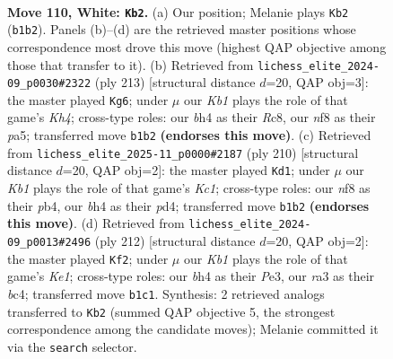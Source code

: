 \documentclass[11pt]{article}
\begin{document}
\clearpage

\begin{figure}[p]\centering
\begin{subfigure}{0.46\textwidth}\centering
\resizebox{\linewidth}{!}{%
\newchessgame
\chessboard[
  setfen={5n2/1R6/7p/4p3/6kb/r2p4/8/1K6 w - - 16 110},
  showmover=false,
  pgfstyle=straightmove, color=movearrow, markmove={b1-b2}
]}
\caption{}
\end{subfigure}\hfill
\begin{subfigure}{0.46\textwidth}\centering
\resizebox{\linewidth}{!}{%
\newchessgame
\chessboard[
  setfen={2r5/8/8/P3K2k/3R4/8/3Bb3/8 b - - 64 107},
  showmover=false,
  pgfstyle=straightmove, color=movearrow, markmove={h5-g6}
]}
\caption{}
\end{subfigure}
\\[4pt]
\begin{subfigure}{0.46\textwidth}\centering
\resizebox{\linewidth}{!}{%
\newchessgame
\chessboard[
  setfen={8/2R5/8/8/1p1p4/1k6/4r3/2K5 w - - 4 106},
  showmover=false,
  pgfstyle=straightmove, color=movearrow, markmove={c1-d1}
]}
\caption{}
\end{subfigure}\hfill
\begin{subfigure}{0.46\textwidth}\centering
\resizebox{\linewidth}{!}{%
\newchessgame
\chessboard[
  setfen={r7/8/8/2k5/2b1pN2/4P3/8/1R2K3 w - - 76 107},
  showmover=false,
  pgfstyle=straightmove, color=movearrow, markmove={e1-f2}
]}
\caption{}
\end{subfigure}
\caption{\textbf{Move 110, White: \texttt{Kb2}.} (a) Our position; Melanie plays \texttt{Kb2} (\texttt{b1b2}). Panels (b)--(d) are the retrieved master positions whose correspondence most drove this move (highest QAP objective among those that transfer to it). (b) Retrieved from \texttt{lichess\_elite\_2024-09\_p0030\#2322} (ply 213) [structural distance $d$=20, QAP obj=3]: the master played \texttt{Kg6}; under $\mu$ our \emph{Kb1} plays the role of that game's \emph{Kh4}; cross-type roles: our \emph{b}h4 as their \emph{R}c8, our \emph{n}f8 as their \emph{p}a5; transferred move \texttt{b1b2} \textbf{(endorses this move)}. (c) Retrieved from \texttt{lichess\_elite\_2025-11\_p0000\#2187} (ply 210) [structural distance $d$=20, QAP obj=2]: the master played \texttt{Kd1}; under $\mu$ our \emph{Kb1} plays the role of that game's \emph{Kc1}; cross-type roles: our \emph{n}f8 as their \emph{p}b4, our \emph{b}h4 as their \emph{p}d4; transferred move \texttt{b1b2} \textbf{(endorses this move)}. (d) Retrieved from \texttt{lichess\_elite\_2024-09\_p0013\#2496} (ply 212) [structural distance $d$=20, QAP obj=2]: the master played \texttt{Kf2}; under $\mu$ our \emph{Kb1} plays the role of that game's \emph{Ke1}; cross-type roles: our \emph{b}h4 as their \emph{P}e3, our \emph{r}a3 as their \emph{b}c4; transferred move \texttt{b1c1}. Synthesis: 2 retrieved analogs transferred to \texttt{Kb2} (summed QAP objective 5, the strongest correspondence among the candidate moves); Melanie committed it via the \texttt{search} selector.}
\label{fig:thought-m218}
\end{figure}
\end{document}
